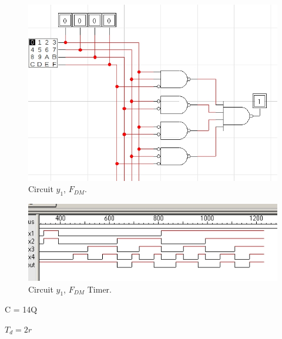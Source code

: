 \documentclass{article}
\begin{document}
			\begin{center} \begin{figure}[!ht]
				\begin{mdframed} \begin{center}
					\includegraphics[scale=0.5]{./imgs/Circuit1_FDM_ex1.jpg}
					\caption{Circuit $y_1$, $F_{DM}$.}
				\end{center} \end{mdframed}
				\label{fig:circuit_y1_fdm}
			\end{figure} \end{center}
			
			\begin{center} \begin{figure}[!ht]
				\begin{mdframed} \begin{center}
					\includegraphics[scale=0.5]{./imgs/Circuit1_FDM_ex1_timer.jpg}
					\caption{Circuit $y_1$, $F_{DM}$ Timer.}
				\end{center} \end{mdframed}
				\label{fig:circuit_y1_fdm_timer}
			\end{figure} \end{center}

			\begin{center}
				\par C = 14Q
				\par $T_d = 2r$
			\end{center}
			\pagebreak
\end{document}
